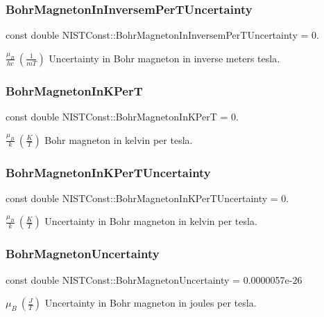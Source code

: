 \subsubsection{\texorpdfstring{Bohr\+Magneton\+In\+Inversem\+Per\+T\+Uncertainty}{BohrMagnetonInInversemPerTUncertainty}}
{\footnotesize\ttfamily const double N\+I\+S\+T\+Const\+::\+Bohr\+Magneton\+In\+Inversem\+Per\+T\+Uncertainty = 0.}

$\frac{\mu_B}{hc} \ (\frac{1}{m T})$ Uncertainty in Bohr magneton in inverse meters tesla. \mbox{\label{group___bohr_magneton_ga4fcb81eff2823748ae5fced898ecc0ec}} 
\subsubsection{\texorpdfstring{Bohr\+Magneton\+In\+K\+PerT}{BohrMagnetonInKPerT}}
{\footnotesize\ttfamily const double N\+I\+S\+T\+Const\+::\+Bohr\+Magneton\+In\+K\+PerT = 0.}

$\frac{\mu_B}{k} \ (\frac{K}{T})$ Bohr magneton in kelvin per tesla. \mbox{\label{group___bohr_magneton_ga25a3b7882df7b01e29f7d0ec090a6f91}} 
\subsubsection{\texorpdfstring{Bohr\+Magneton\+In\+K\+Per\+T\+Uncertainty}{BohrMagnetonInKPerTUncertainty}}
{\footnotesize\ttfamily const double N\+I\+S\+T\+Const\+::\+Bohr\+Magneton\+In\+K\+Per\+T\+Uncertainty = 0.}

$\frac{\mu_B}{k} \ (\frac{K}{T})$ Uncertainty in Bohr magneton in kelvin per tesla. \mbox{\label{group___bohr_magneton_gaf2591aab0321fec9056cc1a8479cb05b}} 
\subsubsection{\texorpdfstring{Bohr\+Magneton\+Uncertainty}{BohrMagnetonUncertainty}}
{\footnotesize\ttfamily const double N\+I\+S\+T\+Const\+::\+Bohr\+Magneton\+Uncertainty = 0.\+0000057e-\/26}

$\mu_B \ (\frac{J}{T})$ Uncertainty in Bohr magneton in joules per tesla. 